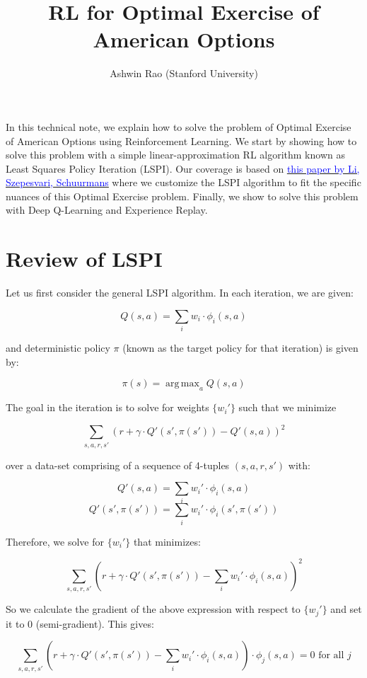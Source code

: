 \documentclass[12pt]{amsart}
\title{RL for Optimal Exercise of American Options}
\author{Ashwin Rao (Stanford University)}
\date{} %
\DeclareMathOperator*{\argmax}{arg\,max}
\begin{document}
\maketitle

In this technical note, we explain how to solve the problem of Optimal Exercise of American Options using Reinforcement Learning. We start by showing how to solve this problem with a simple linear-approximation RL algorithm known as Least Squares Policy Iteration (LSPI). Our coverage is based on \href{http://proceedings.mlr.press/v5/li09d/li09d.pdf}{\underline{\textcolor{blue}{this paper by Li, Szepesvari, Schuurmans}}} where we customize the LSPI algorithm to fit the specific nuances of this Optimal Exercise problem. Finally, we show to solve this problem with Deep Q-Learning and Experience Replay.

\section{Review of LSPI}

Let us first consider the general LSPI algorithm. In each iteration, we are given:

$$Q(s,a) = \sum_i w_i \cdot \phi_i(s,a)$$

and deterministic policy $\pi$ (known as the target policy for that iteration) is given by:

$$\pi(s) = \argmax_a Q(s,a)$$

The goal in the iteration is to solve for weights $\{w_i'\}$ such that we minimize

$$\sum_{s,a,r,s'} (r + \gamma \cdot Q'(s',\pi(s')) - Q'(s,a))^2$$

over a data-set comprising of a sequence of 4-tuples $(s,a,r,s')$ with:

$$Q'(s,a) = \sum_i w_i' \cdot \phi_i(s,a)$$
$$Q'(s',\pi(s')) = \sum_i w_i' \cdot \phi_i(s', \pi(s'))$$

Therefore, we solve for $\{w_i'\}$ that minimizes:

$$\sum_{s,a,r,s'} (r + \gamma \cdot Q'(s',\pi(s')) - \sum_i w_i' \cdot \phi_i(s,a))^2$$

So we calculate the gradient of the above expression with respect to $\{w_j'\}$ and set it to 0 (semi-gradient). This gives:

\begin{equation}
\sum_{s,a,r,s'} (r + \gamma \cdot Q'(s',\pi(s')) - \sum_i w_i' \cdot \phi_i(s,a)) \cdot \phi_j(s,a) = 0 \text{ for all } j
\label{eq:general-lspi}
\end{equation}
\end{document}
